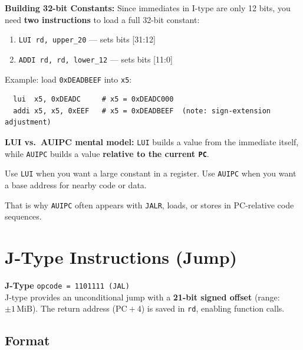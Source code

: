 \documentclass[12pt, a4paper, oneside]{book}
\begin{document}
\begin{keybox}
\textbf{\color{gold}Building 32-bit Constants:}
Since immediates in I-type are only 12 bits, you need \textbf{two instructions} to load a full 32-bit constant:
\begin{enumerate}
  \item \texttt{LUI rd, upper\_20} --- sets bits [31:12]
  \item \texttt{ADDI rd, rd, lower\_12} --- sets bits [11:0]
\end{enumerate}
Example: load \texttt{0xDEADBEEF} into \texttt{x5}:
\begin{lstlisting}
  lui  x5, 0xDEADC     # x5 = 0xDEADC000
  addi x5, x5, 0xEEF   # x5 = 0xDEADBEEF  (note: sign-extension adjustment)
\end{lstlisting}
\vspace{-0.3cm}
\end{keybox}

\begin{infobox}
\textbf{\color{accentblue}LUI vs.\ AUIPC mental model:}
\texttt{LUI} builds a value from the immediate itself, while \texttt{AUIPC} builds a value \textbf{relative to the current \texttt{PC}}.

Use \texttt{LUI} when you want a large constant in a register. Use \texttt{AUIPC} when you want a base address for nearby code or data.

That is why \texttt{AUIPC} often appears with \texttt{JALR}, loads, or stores in PC-relative code sequences.
\end{infobox}

\newpage

\section{J-Type Instructions (Jump)}

\begin{infobox}
\textbf{\color{jtypecolor}\Large J-Type} \hfill \texttt{opcode = 1101111 (JAL)}\\[6pt]
J-type provides an unconditional jump with a \textbf{21-bit signed offset} (range: $\pm 1\,\text{MiB}$). The return address ($\text{PC}+4$) is saved in \texttt{rd}, enabling function calls.
\end{infobox}

\subsection{Format}
\end{document}
